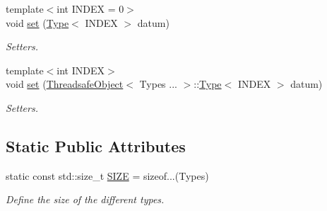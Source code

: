 \begin{DoxyCompactItemize}
{\footnotesize template$<$int I\+N\+D\+EX = 0$>$ }\\void \hyperlink{classreal__time__tools_1_1ThreadsafeObject_a57fe7089b589f905a13127c50ceb2dae}{set} (\hyperlink{classreal__time__tools_1_1ThreadsafeObject_afcbd77df1964d4fe606f1e776f1ff9b8}{Type}$<$ I\+N\+D\+EX $>$ datum)
\begin{DoxyCompactList}\small\item\em Setters. \end{DoxyCompactList}\item 
{\footnotesize template$<$int I\+N\+D\+EX$>$ }\\void \hyperlink{classreal__time__tools_1_1ThreadsafeObject_af77c2b97547459cf1a1e73c72cecd2a9}{set} (\hyperlink{classreal__time__tools_1_1ThreadsafeObject}{Threadsafe\+Object}$<$ Types ... $>$\+::\hyperlink{classreal__time__tools_1_1ThreadsafeObject_afcbd77df1964d4fe606f1e776f1ff9b8}{Type}$<$ I\+N\+D\+EX $>$ datum)
\begin{DoxyCompactList}\small\item\em Setters. \end{DoxyCompactList}\end{DoxyCompactItemize}
\subsection*{Static Public Attributes}
\begin{DoxyCompactItemize}
\item 
\mbox{\label{classreal__time__tools_1_1ThreadsafeObject_af05c02b66f0b75ea12cde9274bc2a97d}} 
static const std\+::size\+\_\+t \hyperlink{classreal__time__tools_1_1ThreadsafeObject_af05c02b66f0b75ea12cde9274bc2a97d}{S\+I\+ZE} = sizeof...(Types)
\begin{DoxyCompactList}\small\item\em Define the size of the different types. \end{DoxyCompactList}\end{DoxyCompactItemize}
